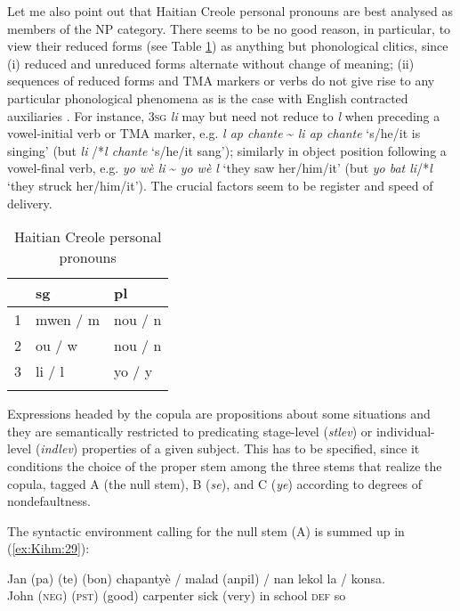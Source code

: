 \documentclass[output=paper]{langsci/langscibook}
\begin{document}
Let me also point out that Haitian Creole personal pronouns are best
analysed as members of the NP category. There seems to be no good
reason, in particular, to view their reduced forms (see Table \ref{tab:Kihm:1}) as
anything but phonological clitics, since (i) reduced and unreduced forms
alternate without change of meaning; (ii) sequences of reduced forms and
TMA markers or verbs do not give rise to any particular phonological
phenomena as is the case with English contracted auxiliaries %
\citep{Bender2000}%
%
. For instance, \textsc{3sg} \emph{li} may but need not reduce
to \emph{l} when preceding a vowel-initial verb or TMA marker, e.g.
\emph{l ap chante} \textasciitilde{} \emph{li ap chante} `s/he/it is
singing' (but \emph{li} /*\emph{l chante} `s/he/it sang'); similarly in
object position following a vowel-final verb, e.g. \emph{yo wè li}
\textasciitilde{} \emph{yo wè l} `they saw her/him/it' (but \emph{yo bat
li}/*\emph{l} `they struck her/him/it'). The crucial factors seem to be
register and speed of delivery.
\begin{table}
\begin{tabular}[c]{@{}lll@{}}
\lsptoprule
& sg & pl\tabularnewline
\midrule
1 & mwen / m & nou / n\tabularnewline
2 & ou / w & nou / n\tabularnewline
3 & li / l & yo / y\tabularnewline
\lspbottomrule
\caption{Haitian Creole personal pronouns} %
\label{tab:Kihm:1}
\end{tabular}
\end{table}

\largerpage
Expressions headed by the copula are propositions about some situations
and they are semantically restricted to predicating stage-level
(\emph{stlev}) or individual-level (\emph{indlev}) properties of a given
subject. This has to be specified, since it conditions the choice of the
proper stem among the three stems that realize the copula, tagged A (the
null stem), B (\emph{se}), and C (\emph{ye}) according to degrees of
nondefaultness.

The syntactic environment calling for the null stem (A) is summed up in
(\ref{ex:Kihm:29}):

\ea\label{ex:Kihm:29} \gll Jan (pa) (te) (bon) chapantyè  /  malad (anpil) / nan lekol la / konsa.\\
John \textsc{(neg)}  \textsc{(pst)} (good) carpenter {} sick (very) {} in school \textsc{def} {} so \\
\glt {} \\
\z
\end{document}
